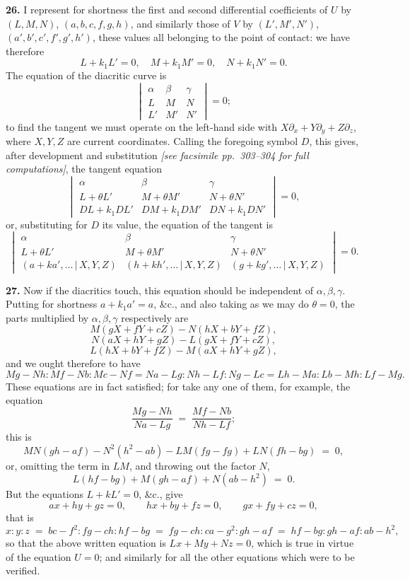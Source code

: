 \documentclass[11pt,a4paper]{article}
\providecommand{\mid}{\,|\,}
\begin{document}
\textbf{26.} I represent for shortness the first and second differential coefficients of $U$ by $(L, M, N)$, $(a, b, c, f, g, h)$, and similarly those of $V$ by $(L', M', N')$, $(a', b', c', f', g', h')$, these values all belonging to the point of contact: we have therefore
\[
L + k_1 L' = 0,\quad M + k_1 M' = 0,\quad N + k_1 N' = 0.
\]
The equation of the diacritic curve is
\[
\begin{vmatrix} \alpha & \beta & \gamma \\ L & M & N \\ L' & M' & N' \end{vmatrix} = 0;
\]
to find the tangent we must operate on the left-hand side with $X\partial_x + Y\partial_y + Z\partial_z$, where $X, Y, Z$ are current coordinates. Calling the foregoing symbol $D$, this gives, after development and substitution \textit{[see facsimile pp.~303--304 for full computations]}, the tangent equation
\[
\begin{vmatrix} \alpha & \beta & \gamma \\ L + \theta L' & M + \theta M' & N + \theta N' \\ DL + k_1 DL' & DM + k_1 DM' & DN + k_1 DN' \end{vmatrix} = 0,
\]
or, substituting for $D$ its value, the equation of the tangent is
\[
\begin{vmatrix} \alpha & \beta & \gamma \\ L + \theta L' & M + \theta M' & N + \theta N' \\ (a + ka', \ldots \mid X, Y, Z) & (h + kh', \ldots \mid X, Y, Z) & (g + kg', \ldots \mid X, Y, Z)\end{vmatrix} = 0.
\]

\medskip

\textbf{27.} Now if the diacritics touch, this equation should be independent of $\alpha, \beta, \gamma$. Putting for shortness $a + k_1 a' = a$, \&c., and also taking as we may do $\theta = 0$, the parts multiplied by $\alpha, \beta, \gamma$ respectively are
\[
M(gX + fY + cZ) - N(hX + bY + fZ),
\]
\[
N(aX + hY + gZ) - L(gX + fY + cZ),
\]
\[
L(hX + bY + fZ) - M(aX + hY + gZ),
\]
and we ought therefore to have
\[
Mg - Nh : Mf - Nb : Mc - Nf = Na - Lg : Nh - Lf : Ng - Lc = Lh - Ma : Lb - Mh : Lf - Mg.
\]
These equations are in fact satisfied; for take any one of them, for example, the equation
\[
\frac{Mg - Nh}{Na - Lg} \;=\; \frac{Mf - Nb}{Nh - Lf};
\]
this is
\[
MN(gh - af) - N^2(h^2 - ab) - LM(fg - fg) + LN(fh - bg) \;=\; 0,
\]
or, omitting the term in $LM$, and throwing out the factor $N$,
\[
L(hf - bg) + M(gh - af) + N(ab - h^2) \;=\; 0.
\]
But the equations $L + kL' = 0$, \&c., give
\[
ax + hy + gz = 0,\qquad hx + by + fz = 0,\qquad gx + fy + cz = 0,
\]
that is
\[
x : y : z \;=\; bc - f^2 : fg - ch : hf - bg \;=\; fg - ch : ca - g^2 : gh - af \;=\; hf - bg : gh - af : ab - h^2,
\]
so that the above written equation is $Lx + My + Nz = 0$, which is true in virtue of the equation $U = 0$; and similarly for all the other equations which were to be verified.
\end{document}
